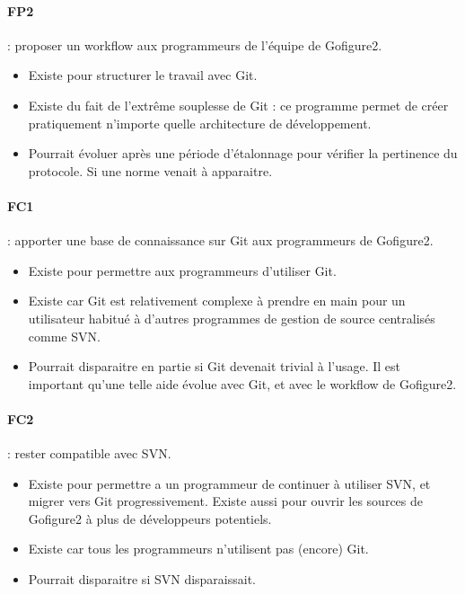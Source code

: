 \paragraph*{FP2} : proposer un workflow aux programmeurs de l'équipe de Gofigure2.
\begin{itemize}
  \item Existe pour structurer le travail avec Git.
  \item Existe du fait de l'extrême souplesse de Git : ce programme 
  permet de créer pratiquement n'importe quelle architecture de développement.
  \item Pourrait évoluer après une période d'étalonnage pour vérifier la pertinence du protocole.
  Si une norme venait à apparaitre.
\end{itemize}

\paragraph*{FC1} : apporter une base de connaissance sur Git aux programmeurs de Gofigure2.
\begin{itemize}
  \item Existe pour permettre aux programmeurs d'utiliser Git.
  \item Existe car Git est relativement complexe à prendre en main 
  pour un utilisateur habitué à d'autres programmes de gestion de source centralisés comme SVN.
  \item Pourrait disparaitre en partie si Git devenait trivial à l'usage.
  Il est important qu'une telle aide évolue avec Git, et avec le workflow de Gofigure2.
\end{itemize}

\paragraph*{FC2} : rester compatible avec SVN.
\begin{itemize}
  \item Existe pour permettre a un programmeur de continuer à utiliser SVN, et migrer vers Git progressivement.
  Existe aussi pour ouvrir les sources de Gofigure2 à plus de développeurs potentiels.
  \item Existe car tous les programmeurs n'utilisent pas (encore) Git.
  \item Pourrait disparaitre si SVN disparaissait.
\end{itemize}

